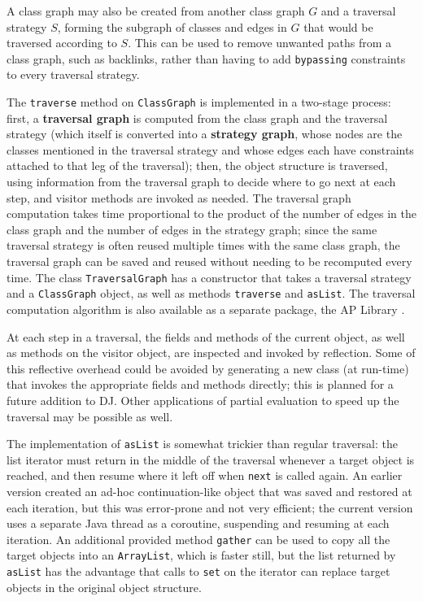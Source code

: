 \documentclass{llncs}
\newcommand{\defn}[1]{\textbf{#1}}
\newcommand{\code}[1]{\texttt{#1}}
\begin{document}
A class graph may also be created from another class graph $G$ and a
traversal strategy $S$, forming the subgraph of classes and edges in
$G$ that would be traversed according to $S$.  This can be used to
remove unwanted paths from a class graph, such as backlinks, rather
than having to add \code{bypassing} constraints to every traversal
strategy.

The \code{traverse} method on \code{ClassGraph} is implemented in a
two-stage process: first, a \defn{traversal graph} is computed from
the class graph and the traversal strategy (which itself is converted
into a \defn{strategy graph}, whose nodes are the classes mentioned in
the traversal strategy and whose edges each have constraints attached
to that leg of the traversal); then, the object structure is
traversed, using information from the traversal graph to decide where
to go next at each step, and visitor methods are invoked as needed.
The traversal graph computation takes time proportional to the product
of the number of edges in the class graph and the number of edges in
the strategy graph; since the same traversal strategy is often reused
multiple times with the same class graph, the traversal graph can be
saved and reused without needing to be recomputed every time.  The
class \code{TraversalGraph} has a constructor that takes a traversal
strategy and a \code{ClassGraph} object, as well as methods
\code{traverse} and \code{asList}.  The traversal computation
algorithm is also available as a separate package, the AP Library
\cite{AP-Lib:99}.

At each step in a traversal, the fields and methods of the current
object, as well as methods on the visitor object, are inspected and
invoked by reflection.  Some of this reflective overhead could be
avoided by generating a new class (at run-time) that invokes the
appropriate fields and methods directly; this is planned for a future
addition to DJ.  Other applications of partial evaluation to speed up
the traversal may be possible as well.

The implementation of \code{asList} is somewhat trickier than regular
traversal: the list iterator must return in the middle of the
traversal whenever a target object is reached, and then resume where
it left off when \code{next} is called again.  An earlier version
created an ad-hoc continuation-like object that was saved and restored
at each iteration, but this was error-prone and not very efficient;
the current version uses a separate Java thread as a coroutine,
suspending and resuming at each iteration.  An additional provided method
\code{gather} can be used to copy all the target objects into an
\code{ArrayList}, which is faster still, but the list returned by
\code{asList} has the advantage that calls to \code{set} on the
iterator can replace target objects in the original object structure.
\end{document}
